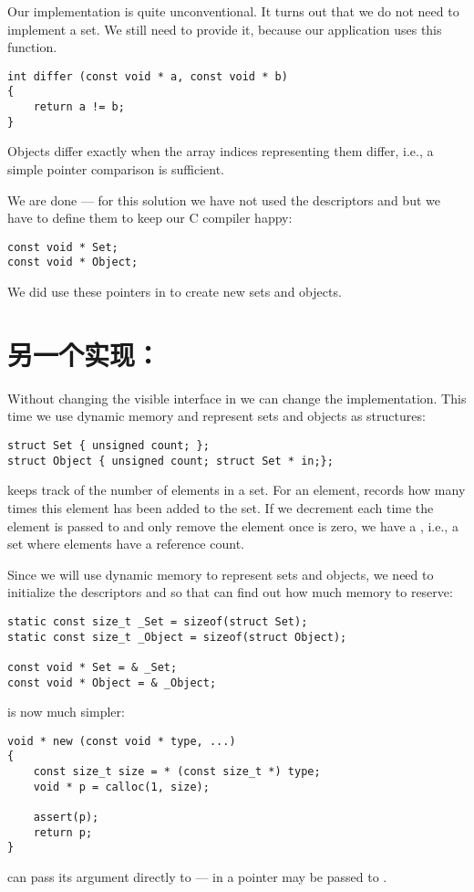 Our implementation is quite unconventional. It turns out that we do not need
 to implement a set. We still need to provide it, because our
application uses this function.
\begin{lstlisting}
int differ (const void * a, const void * b)
{
	return a != b;
}
\end{lstlisting}
Objects differ exactly when the array indices representing them differ,
i.e., a simple pointer comparison is sufficient.

We are done --- for this solution we have not used the descriptors
 and  but we have to define them to keep our C
compiler happy:
\begin{lstlisting}
const void * Set;
const void * Object;
\end{lstlisting}
We did use these pointers in  to create new sets and objects.

\section{另一个实现：}
Without changing the visible interface in  we can change the
implementation. This time we use dynamic memory and represent sets and
objects as structures:
\begin{lstlisting}
struct Set { unsigned count; };
struct Object { unsigned count; struct Set * in;};
\end{lstlisting}
 keeps track of the number of elements in a set. For an element,
 records how many times this element has been added to the set.
If we decrement  each time the element is passed to
 and only remove the element once  is zero, we have
a , i.e., a set where elements have a reference count.

Since we will use dynamic memory to represent sets and objects, we need to
initialize the descriptors  and  so that
 can find out how much memory to reserve:
\begin{lstlisting}
static const size_t _Set = sizeof(struct Set);
static const size_t _Object = sizeof(struct Object);

const void * Set = & _Set;
const void * Object = & _Object;
\end{lstlisting}
 is now much simpler:
\begin{lstlisting}
void * new (const void * type, ...)
{
	const size_t size = * (const size_t *) type;
	void * p = calloc(1, size);

	assert(p);
	return p;
}
\end{lstlisting}
 can pass its argument directly to  --- in
 a  pointer may be passed to .


